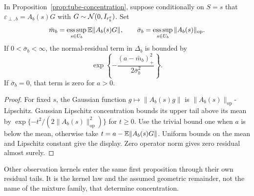 \begin{corollary}
\label{cor:gaussian-tube-tail}
In Proposition~\ref{prop:tube-concentration}, suppose conditionally on $S=s$
that $\varepsilon_{\perp,b}=A_b(s)G$ with
$G\sim\mathcal N(0,I_{r_b^{\varepsilon}})$. Set
\[
 \bar m_b=\operatorname*{ess\,sup}_{s\in U_b}\mathbb E\|A_b(s)G\|,
 \qquad
 \bar\sigma_b=\operatorname*{ess\,sup}_{s\in U_b}\|A_b(s)\|_{\mathrm{op}}.
\]
If $0<\bar\sigma_b<\infty$, the normal-residual term in $\Delta_b$ is
bounded by
\[
 \exp\left\{-\frac{(a-\bar m_b)_+^2}{2\bar\sigma_b^2}\right\}.
\]
If $\bar\sigma_b=0$, that term is zero for $a>0$.
\end{corollary}
\begin{proof}
For fixed $s$, the Gaussian function $g\mapsto\|A_b(s)g\|$ is
$\|A_b(s)\|_{\mathrm{op}}$-Lipschitz. Gaussian Lipschitz concentration
\citep{boucheron2013concentration} bounds its upper tail above its mean
by $\exp\{-t^2/(2\|A_b(s)\|_{\mathrm{op}}^2)\}$ for $t\ge0$.
Use the trivial bound one when $a$ is below the mean, otherwise take
$t=a-\mathbb E\|A_b(s)G\|$. Uniform bounds on the mean and Lipschitz constant
give the display. Zero operator norm gives zero residual almost surely.
\end{proof}

Other observation kernels enter the same first proposition through their
own residual tails. It is the kernel law and the assumed geometric remainder,
not the name of the mixture family, that determine concentration.
